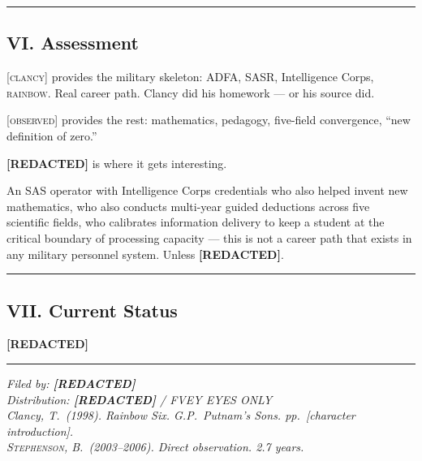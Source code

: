 \vspace{1cm}\hrule\vspace{1cm}

\subsection*{VI. Assessment}
\label{interlude:assessment}

\textsc{[clancy]} provides the military skeleton: ADFA, SASR, Intelligence Corps, \textsc{rainbow}. Real career path. Clancy did his homework --- or his source did.

\textsc{[observed]} provides the rest: mathematics, pedagogy, five-field convergence, ``new definition of zero.''

\textbf{[REDACTED]} is where it gets interesting.

An SAS operator with Intelligence Corps credentials who also helped invent new mathematics, who also conducts multi-year guided deductions across five scientific fields, who calibrates information delivery to keep a student at the critical boundary of processing capacity --- this is not a career path that exists in any military personnel system. Unless \textbf{[REDACTED]}.

\vspace{1cm}\hrule\vspace{1cm}

\subsection*{VII. Current Status}
\label{interlude:current-status}

\textbf{[REDACTED]}

\vspace{1cm}\hrule\vspace{0.5cm}

\begin{flushright}\small\textit{%
Filed by: \textbf{[REDACTED]}\\
Distribution: \textbf{[REDACTED]} / FVEY EYES ONLY\\[0.5em]
Clancy, T.\ (1998). Rainbow Six. G.P.\ Putnam's Sons. pp.\ [character introduction].\\
\textsc{Stephenson}, B.\ (2003--2006). Direct observation. 2.7 years.%
}\end{flushright}

\chapterreturn
